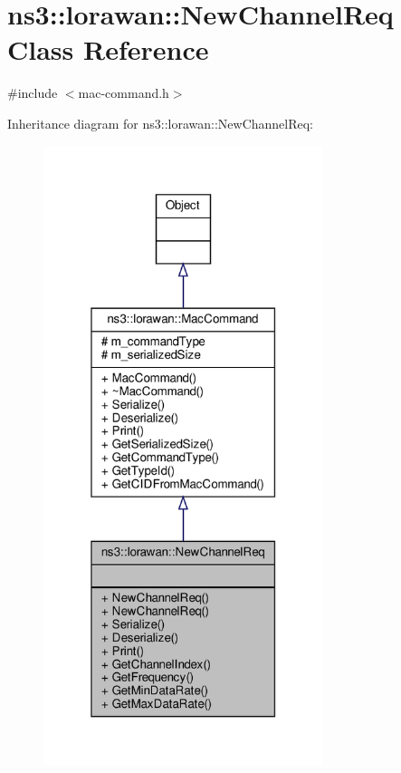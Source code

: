 \hypertarget{classns3_1_1lorawan_1_1NewChannelReq}{}\section{ns3\+:\+:lorawan\+:\+:New\+Channel\+Req Class Reference}
\label{classns3_1_1lorawan_1_1NewChannelReq}


{\ttfamily \#include $<$mac-\/command.\+h$>$}



Inheritance diagram for ns3\+:\+:lorawan\+:\+:New\+Channel\+Req\+:
\nopagebreak
\begin{figure}[H]
\begin{center}
\leavevmode
\includegraphics[width=232pt]{classns3_1_1lorawan_1_1NewChannelReq__inherit__graph}
\end{center}
\end{figure}



